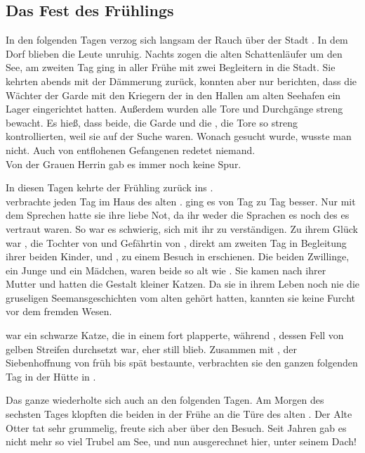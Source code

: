 \begin{Large}
\chapter{Das Fest des Frühlings}
In den folgenden Tagen verzog sich langsam der Rauch über der Stadt {\Tern}. In dem Dorf {\Berna} blieben die Leute unruhig. Nachts zogen die alten Schattenläufer um den See, am zweiten Tag ging in aller Frühe {\Nox} mit zwei Begleitern in die Stadt. Sie kehrten abends mit der Dämmerung zurück, konnten aber nur berichten, dass die Wächter der Garde mit den Kriegern der {\Bangiri} in den Hallen am alten Seehafen ein Lager eingerichtet hatten. Außerdem wurden alle Tore und Durchgänge streng bewacht. Es hieß, dass beide, die Garde und die {\Bangiri}, die Tore so streng kontrollierten, weil sie auf der Suche waren. Wonach gesucht wurde, wusste man nicht. Auch von entflohenen Gefangenen redetet niemand.\\
Von der Grauen Herrin gab es immer noch keine Spur. 

In diesen Tagen kehrte der Frühling zurück ins {\Enland}.\\
{\Salbana} verbrachte jeden Tag im Haus des alten {\Marn}. {\Sepa} ging es von Tag zu Tag besser. Nur mit dem Sprechen hatte sie ihre liebe Not, da ihr weder die Sprachen {\Rhinland}es noch des {\Enland}es vertraut waren. So war es schwierig, sich mit ihr zu verständigen. Zu ihrem Glück war {\Mena}, die Tochter von {\Eno} und Gefährtin von {\Nox}, direkt am zweiten Tag in Begleitung ihrer beiden Kinder, {\Enno} und {\Ena}, zu einem Besuch in {\AltBerna} erschienen. Die beiden Zwillinge, ein Junge und ein Mädchen, waren beide so alt wie {\Sepa}. Sie kamen nach ihrer Mutter und hatten die Gestalt kleiner Katzen. Da sie in ihrem Leben noch nie die gruseligen Seemansgeschichten vom alten {\Marn} gehört hatten, kannten sie keine Furcht vor dem fremden Wesen.

{\Ena} war ein schwarze Katze, die in einem fort plapperte, während {\Enno}, dessen Fell von gelben Streifen durchsetzt war, eher still blieb. Zusammen mit {\Piedo}, der Siebenhoffnung von früh bis spät bestaunte, verbrachten sie den ganzen folgenden Tag in der Hütte in {\AltBerna}. 

Das ganze wiederholte sich auch an den folgenden Tagen. Am Morgen des sechsten Tages klopften die beiden in der Frühe an die Türe des alten {\Marn}. Der Alte Otter {\Marn} tat sehr grummelig, freute sich aber über den Besuch. Seit Jahren gab es nicht mehr so viel Trubel am See, und nun ausgerechnet hier, unter seinem Dach!


\end{Large}
